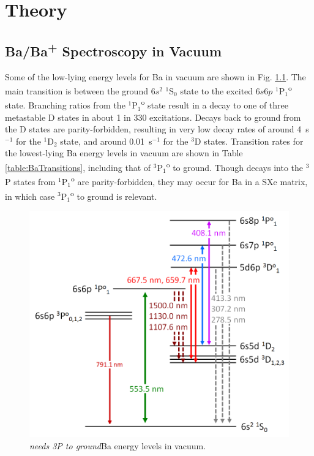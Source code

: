 \chapter{Theory}


\section{Ba/Ba\textsuperscript{+} Spectroscopy in Vacuum}
\label{sec:vacuum}

Some of the low-lying energy levels for Ba in vacuum are shown in Fig. \ref{fig:elevsBa}.  The main transition is between the ground $6s^{2}$ $^{1}$S$_{0}$ state to the excited $6s6p$ $^{1}$P$_{1}$\textsuperscript{o} state.  Branching ratios from the $^{1}$P$_{1}$\textsuperscript{o} state result in a decay to one of three metastable D states in about 1 in 330 excitations.  Decays back to ground from the D states are parity-forbidden, resulting in very low decay rates of around 4~s$^{-1}$ for the $^{1}$D$_{2}$ state, and around 0.01~s$^{-1}$ for the $^{3}$D states.  Transition rates for the lowest-lying Ba energy levels in vacuum are shown in Table \ref{table:BaTransitions}, including that of $^{3}$P$_{1}$\textsuperscript{o} to ground.  Though decays into the $^{3}$P states from $^{1}$P$_{1}$\textsuperscript{o} are parity-forbidden, they may occur for Ba in a SXe matrix, in which case $^{3}$P$_{1}$\textsuperscript{o} to ground is relevant.

\begin{figure} %
	\includegraphics[width=.8\textwidth]{figures/elevs_Ba_extra_with3P1.png}
	\caption{\emph{\color{gray}needs 3P to ground}Ba energy levels in vacuum.}
    \label{fig:elevsBa}
\end{figure}

